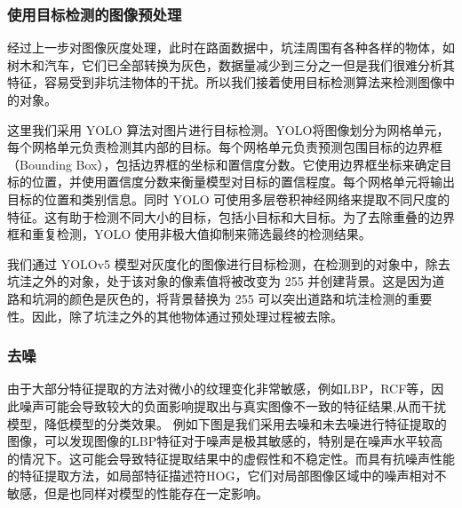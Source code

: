 \documentclass[a4paper, 10pt]{article}
\begin{document}
	\subsubsection{使用目标检测的图像预处理}
	
	经过上一步对图像灰度处理，此时在路面数据中，坑洼周围有各种各样的物体，如树木和汽车，它们已全部转换为灰色，数据量减少到三分之一但是我们很难分析其特征，容易受到非坑洼物体的干扰。所以我们接着使用目标检测算法来检测图像中的对象\cite{DONG2022104914}。
	
	这里我们采用 YOLO 算法对图片进行目标检测。YOLO将图像划分为网格单元，每个网格单元负责检测其内部的目标。每个网格单元负责预测包围目标的边界框（Bounding Box），包括边界框的坐标和置信度分数。它使用边界框坐标来确定目标的位置，并使用置信度分数来衡量模型对目标的置信程度。每个网格单元将输出目标的位置和类别信息。同时 YOLO 可使用多层卷积神经网络来提取不同尺度的特征。这有助于检测不同大小的目标，包括小目标和大目标。为了去除重叠的边界框和重复检测，YOLO 使用非极大值抑制来筛选最终的检测结果。
	
	我们通过 YOLOv5 模型对灰度化的图像进行目标检测，在检测到的对象中，除去坑洼之外的对象，处于该对象的像素值将被改变为 255 并创建背景。这是因为道路和坑洞的颜色是灰色的，将背景替换为 255 可以突出道路和坑洼检测的重要性。因此，除了坑洼之外的其他物体通过预处理过程被去除\cite{rs13020200}。
	
	
	\subsubsection{去噪}
	
	由于大部分特征提取的方法对微小的纹理变化非常敏感，例如LBP，RCF等，因此噪声可能会导致较大的负面影响提取出与真实图像不一致的特征结果,从而干扰模型，降低模型的分类效果。
	例如下图是我们采用去噪和未去噪进行特征提取的图像，可以发现图像的LBP特征对于噪声是极其敏感的，特别是在噪声水平较高的情况下。这可能会导致特征提取结果中的虚假性和不稳定性。而具有抗噪声性能的特征提取方法，如局部特征描述符HOG，它们对局部图像区域中的噪声相对不敏感，但是也同样对模型的性能存在一定影响。
	
\end{document}

